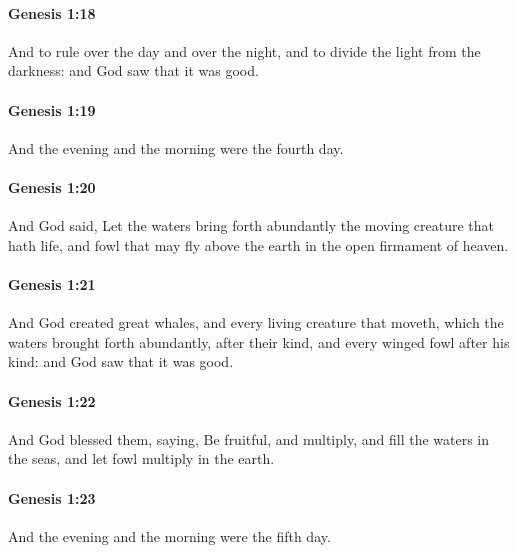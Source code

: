 		\paragraph{Genesis 1:18} %
			\label{GENESIS-1-18}

			And to rule over the day and over the night, and to divide the light from the darkness: and God saw that it was good. 

		\paragraph{Genesis 1:19} %
			\label{GENESIS-1-19}

			And the evening and the morning were the fourth day.

		\paragraph{Genesis 1:20} %
			\label{GENESIS-1-20}

			And God said, Let the waters bring forth abundantly the moving creature that hath life, and fowl that may fly above the earth in the open firmament of heaven.

		\paragraph{Genesis 1:21} %
			\label{GENESIS-1-21}

			And God created great whales, and every living creature that moveth, which the waters brought forth abundantly, after their kind, and every winged fowl after his kind: and God saw that it was good. 

		\paragraph{Genesis 1:22} %
			\label{GENESIS-1-22}

			And God blessed them, saying, Be fruitful, and multiply, and fill the waters in the seas, and let fowl multiply in the earth.

		\paragraph{Genesis 1:23} %
			\label{GENESIS-1-23}

			And the evening and the morning were the fifth day.

